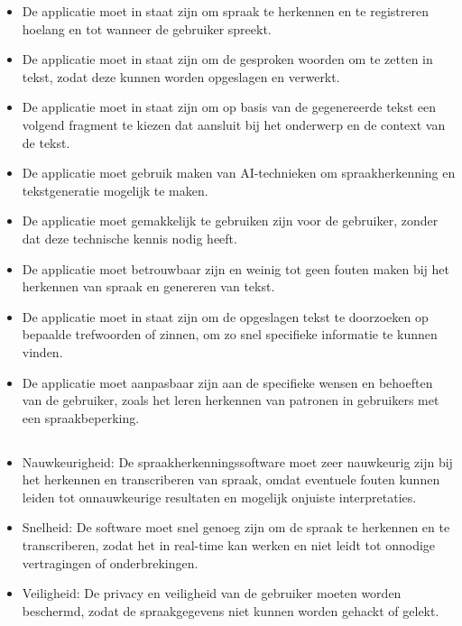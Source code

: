 \begin{itemize}
    \item De applicatie moet in staat zijn om spraak te herkennen en te registreren hoelang en tot wanneer de gebruiker spreekt.
    \item De applicatie moet in staat zijn om de gesproken woorden om te zetten in tekst, zodat deze kunnen worden opgeslagen en verwerkt.
    \item De applicatie moet in staat zijn om op basis van de gegenereerde tekst een volgend fragment te kiezen dat aansluit bij het onderwerp en de context van de tekst.
    \item De applicatie moet gebruik maken van AI-technieken om spraakherkenning en tekstgeneratie mogelijk te maken.
    \item De applicatie moet gemakkelijk te gebruiken zijn voor de gebruiker, zonder dat deze technische kennis nodig heeft.
    \item De applicatie moet betrouwbaar zijn en weinig tot geen fouten maken bij het herkennen van spraak en genereren van tekst.
    \item  De applicatie moet in staat zijn om de opgeslagen tekst te doorzoeken op bepaalde trefwoorden of zinnen, om zo snel specifieke informatie te kunnen vinden.
    \item De applicatie moet aanpasbaar zijn aan de specifieke wensen en behoeften van de gebruiker, zoals het leren herkennen van patronen in gebruikers met een spraakbeperking.
\end{itemize}

\subsection{}

\begin{itemize}
    \item Nauwkeurigheid: De spraakherkenningssoftware moet zeer nauwkeurig zijn bij het herkennen en transcriberen van spraak, omdat eventuele fouten kunnen leiden tot onnauwkeurige resultaten en mogelijk onjuiste interpretaties.
    \item Snelheid: De software moet snel genoeg zijn om de spraak te herkennen en te transcriberen, zodat het in real-time kan werken en niet leidt tot onnodige vertragingen of onderbrekingen.
    \item Veiligheid: De privacy en veiligheid van de gebruiker moeten worden beschermd, zodat de spraakgegevens niet kunnen worden gehackt of gelekt.
\end{itemize}

